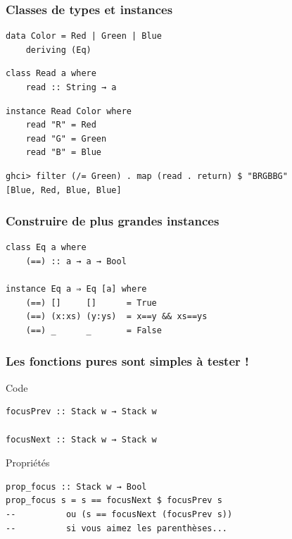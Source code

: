 \documentclass[10pt]{beamer}
\begin{document}
\begin{frame}[fragile]
\frametitle{Classes de types et instances}
\begin{verbatim}
data Color = Red | Green | Blue
    deriving (Eq)
\end{verbatim}

\begin{verbatim}
class Read a where
    read :: String → a
\end{verbatim}
\pause
\begin{verbatim}
instance Read Color where
    read "R" = Red
    read "G" = Green
    read "B" = Blue
\end{verbatim}
\pause
\begin{verbatim}
ghci> filter (/= Green) . map (read . return) $ "BRGBBG"
[Blue, Red, Blue, Blue]
\end{verbatim}
\end{frame}



\begin{frame}[fragile]
\frametitle{Construire de plus grandes instances}
\begin{verbatim}
class Eq a where
    (==) :: a → a → Bool

instance Eq a ⇒ Eq [a] where
    (==) []     []      = True
    (==) (x:xs) (y:ys)  = x==y && xs==ys
    (==) _      _       = False
\end{verbatim}
\end{frame}




\begin{frame}[fragile]
\frametitle{Les fonctions pures sont simples à tester !}
\begin{block}{Code}
\begin{verbatim}
focusPrev :: Stack w → Stack w

focusNext :: Stack w → Stack w
\end{verbatim}
\end{block}
\pause
\begin{block}{Propriétés}
\begin{verbatim}
prop_focus :: Stack w → Bool
prop_focus s = s == focusNext $ focusPrev s
--          ou (s == focusNext (focusPrev s))
--          si vous aimez les parenthèses...
\end{verbatim}
\end{block}
\end{frame}
\end{document}

